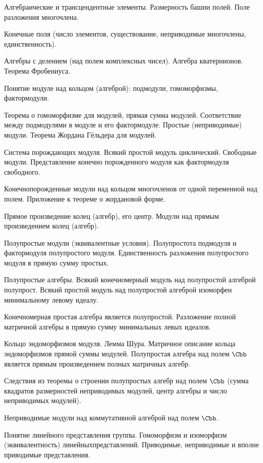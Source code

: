 \documentclass[a4paper]{article}
\begin{document}
\begin{nums}{-3.5}
Алгебраические и трансцендентные элементы. Размерность башни полей.
Поле разложения многочлена.
\item Конечные поля (число элементов, существование, неприводимые многочлены, единственность).
\item Алгебры с делением (над полем комплексных чисел). Алгебра кватернионов. Теорема Фробениуса.
\item Понятие модуле над кольцом (алгеброй): подмодули, гомоморфизмы, фактормодули.
\item Теорема о гомоморфизме для модулей, прямая сумма модулей. Соответствие между подмодулями в модуле и его фактормодуле.
Простые (неприводимые) модули. Теорема Жордана Гёльдера для модулей.
\item Система порождающих модуля. Всякий простой модуль циклический. Свободные модули.
Представление конечно порожденного модуля как фактормодуля свободного.
\item Конечнопорожденные модули над кольцом многочленов от одной переменной над полем.
Приложение к теореме о жордановой форме.
\item Прямое произведение колец (алгебр), его центр. Модули над прямым произведением колец (алгебр).
\item Полупростые модули (эквивалентные условия). Полупростота подмодуля и фактормодуля полупростого модуля.
Единственность разложения полупростого модуля в прямую сумму простых.
\item Полупростые алгебры. Всякий конечномерный модуль над полупростой алгеброй полупрост. Всякий простой модуль над полупростой алгеброй изоморфен минимальному левому идеалу.
\item Конечномерная простая алгебра является полупростой. Разложение полной матричной алгебры в прямую сумму минимальных левых идеалов.
\item Кольцо эндоморфизмов модуля. Лемма Шура. Матричное описание кольца эндоморфизмов прямой суммы модулей.
Полупростая алгебра над полем $\Cbb$ является прямым произведением полных матричных алгебр.
\item Следствия из теоремы о строении полупростых алгебр над полем $\Cbb$ (сумма квадратов размерностей неприводимых модулей, центр алгебры и число неприводимых модулей).
\item Неприводимые модули над коммутативной алгеброй над полем $\Cbb$.
\item Понятие линейного представления группы. Гомоморфизм и изоморфизм (эквивалентность)
линейных\break представлений. Приводимые, неприводимые и вполне приводимые представления.

\end{nums}
\end{document}

